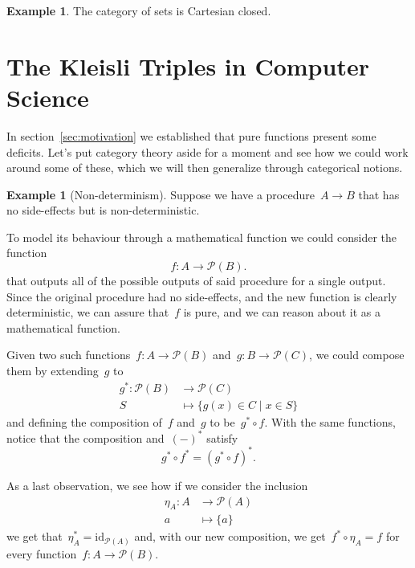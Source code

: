 \documentclass[a4paper]{article}
\theoremstyle{plain}
\theoremstyle{definition}
\newtheorem{example}[theorem]{Example}
\newcommand{\id}{\mathrm{id}}
\begin{document}
\begin{example}
    The category of sets is Cartesian closed.
\end{example}

\section{The Kleisli Triples in Computer Science}
\label{sec:kleisli-triple}
In section~\ref{sec:motivation} we established that pure functions present some
deficits. Let's put category theory aside for a moment and see how we could work
around some of these, which we will then generalize through categorical notions.
\begin{example}[Non-determinism]
    \label{ex:kleisli-non-determinism}
    Suppose we have a procedure~\(A\longrightarrow B\) that has no side-effects
    but is non-deterministic.

    To model its behaviour through a mathematical function we could consider the
    function
    \[
        f:A\longrightarrow\mathcal{P}(B).
    \]
    that outputs all of the possible outputs of said procedure for a single
    output. Since the original procedure had no side-effects, and the new
    function is clearly deterministic, we can assure that~\(f\) is pure, and we
    can reason about it as a mathematical function.

    Given two such functions~\(f:A\longrightarrow\mathcal{P}(B)\)
    and~\(g:B\longrightarrow\mathcal{P}(C)\), we could compose them by
    extending~\(g\) to
    \begin{align*}
        g^{\ast}:\mathcal{P}(B)&\longrightarrow\mathcal{P}(C) \\
        S&\longmapsto\{g(x)\in C \mid x\in S\}
    \end{align*}
    and defining the composition of~\(f\) and~\(g\) to be~\(g^{\ast} \circ f\).
    With the same functions, notice that the composition and~\((-)^{\ast}\)
    satisfy
    \[
        g^{\ast}\circ f^{\ast}
        = (g^{\ast} \circ f)^{\ast}.
    \]

    As a last observation, we see how if we consider the inclusion
    \begin{align*}
        \eta_{A}:A&\longrightarrow\mathcal{P}(A) \\
        a&\longmapsto\{a\}
    \end{align*}
    we get that~\(\eta_{A}^{\ast}=\id_{\mathcal{P}(A)}\) and, with our new
    composition, we get~\(f^{\ast}\circ\eta_{A}=f\) for every
    function~\(f:A\longrightarrow\mathcal{P}(B)\).
\end{example}
\end{document}
